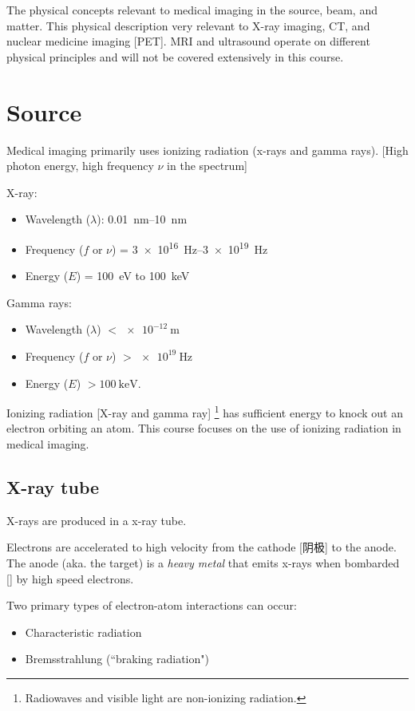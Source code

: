 \documentclass[UTF8,a4paper,11pt]{book}
\theoremstyle{mystyle}{
  \newtheorem{example}{Example}
}
\begin{document}
The
physical concepts relevant to medical imaging
in the source, beam, and matter.
 This physical description very relevant to X-ray
imaging, CT, and nuclear medicine imaging [PET].
{\sf MRI and ultrasound operate on different
physical principles and will not be covered
extensively in this course.}

\section{Source}
Medical imaging primarily uses ionizing
radiation (x-rays and gamma rays). [High photon energy, 
high frequency $\nu$ in the spectrum]

X-ray:
\begin{itemize}
\item Wavelength ($\lambda$): \SIrange{0.01}{10}{\nano\meter}
\item Frequency ($f$ or $\nu$) = \SIrange{3e16}{3e19}{\hertz}
\item Energy ($E$) = \SI{100}{\electronvolt} to \SI{100}{\kilo\electronvolt}
\end{itemize}

Gamma rays:
\begin{itemize}
\item Wavelength ($\lambda$) $< \SI{e-12}{\meter}$
\item Frequency ($f$ or $\nu$) $> \SI{e19}{\hertz}$
\item Energy ($E$) $ > \SI{100}{\kilo\electronvolt}$.
\end{itemize}

 Ionizing radiation [X-ray and gamma ray] 
 \footnote{ Radiowaves and visible light are non-ionizing
radiation.} has sufficient energy to
knock out an electron orbiting an atom. This course focuses 
on the use of ionizing
radiation in medical imaging.

\subsection{X-ray tube}
X-rays are produced in a x-ray tube.

 Electrons are accelerated to high velocity from
the cathode [阴极] to the anode.
The anode (aka. the target) is a \emph{heavy metal}
that emits x-rays when bombarded [] by high
speed electrons.

 Two primary types of electron-atom
interactions can occur:
\begin{itemize}
\item Characteristic radiation
\item Bremsstrahlung (``braking radiation")
\end{itemize}
\end{document}

